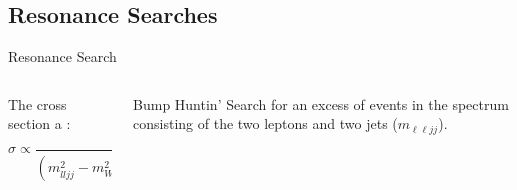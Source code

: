 \documentclass[aspectratio=169]{beamer}
\begin{document}
\subsection{Resonance Searches}

\begin{frame}{Resonance Search}
  \begin{columns}
    \begin{column}{0.4\textwidth}
      \vfill
      {The cross section a :
      $$
        \sigma \propto \frac{1}{\left(m_{lljj}^{2} - m_{W_R}^{2}\right)^{2} + \Gamma^{2} m^{2}_{W_R}}
      $$}
      \begin{figure}
        \centering
        
      \end{figure}
    \end{column}
    \begin{column}{0.59\textwidth}
      \begin{block}{Bump Huntin'}
        Search for an excess of events in the  
        spectrum consisting of the two leptons and two jets ($m_{\ell \ell j j}$).
      \end{block}
      \begin{figure}
        \centering
        \resizebox{0.9\linewidth}{!}{%
      }
      \end{figure}
    \end{column}
  \end{columns}
\end{frame}
\end{document}
